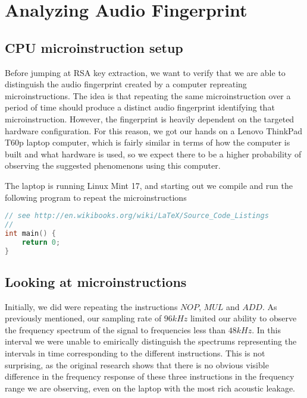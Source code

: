 \chapter{Analyzing Audio Fingerprint}
\label{chp:analyzing} 

\section{CPU microinstruction setup}\label{sec:ch4_cpu_microinstruction_setup}
Before jumping at RSA key extraction, we want to verify that we are able to distinguish the audio fingerprint created by a computer repreating microinstructions. 
The idea is that repeating the same microinstruction over a period of time should produce a distinct audio fingerprint identifying that microinstruction. 
However, the fingerprint is heavily dependent on the targeted hardware configuration. 
For this reason, we got our hands on a Lenovo ThinkPad T60p laptop computer, which is fairly similar in terms of how the computer is built and what hardware is used, so we expect there to be a higher probability of observing the suggested phenomenons using this computer.

The laptop is running Linux Mint 17, and starting out we compile and run the following program to repeat the microinstructions 

\begin{lstlisting}[language=C, caption={Simple Microinstruction Loop}]
// see http://en.wikibooks.org/wiki/LaTeX/Source_Code_Listings
// 
int main() {
	return 0;
}
\end{lstlisting}


\section{Looking at microinstructions}\label{sec:ch4_microinstructions}
Initially, we did were repeating the instructions \( NOP\), \( MUL\) and \( ADD\).
As previously mentioned, our sampling rate of \( 96kHz\) limited our ability to observe the frequency spectrum of the signal to frequencies less than \( 48kHz\).
In this interval we were unable to emirically distinguish the spectrums representing the intervals in time corresponding to the different instructions.
This is not surprising, as the original research shows that there is no obvious visible difference in the frequency response of these three instructions in the frequency range we are observing, even on the laptop with the most rich acoustic leakage. 

